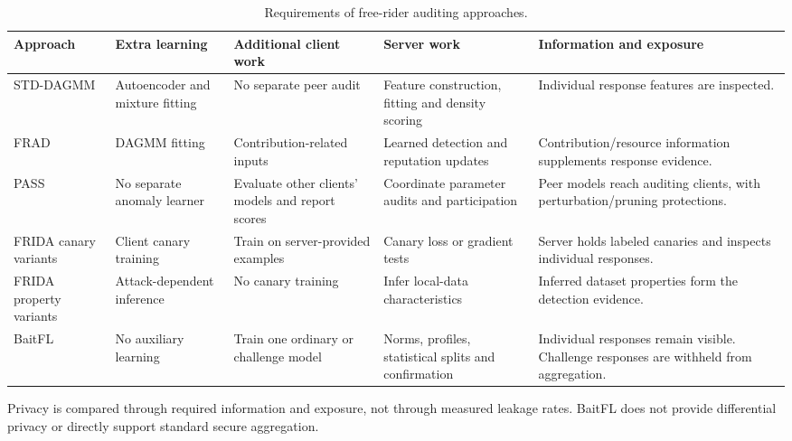 \begin{table}[t]\centering\footnotesize
\renewcommand{\arraystretch}{1.1}
\caption{Requirements of free-rider auditing approaches.}\label{tab:method-comparison}
\begin{tabular}{>{\raggedright\arraybackslash}p{2.0cm}>{\raggedright\arraybackslash}p{2.0cm}>{\raggedright\arraybackslash}p{2.7cm}>{\raggedright\arraybackslash}p{3.6cm}>{\raggedright\arraybackslash}p{5.0cm}}\toprule
Approach & Extra learning & Additional client work & Server work & Information and exposure \\ \midrule
STD-DAGMM~\cite{lin2019freeriders} & Autoencoder and mixture fitting & No separate peer audit & Feature construction, fitting and density scoring & Individual response features are inspected. \\
FRAD~\cite{wang2024frad} & DAGMM fitting & Contribution-related inputs & Learned detection and reputation updates & Contribution/resource information supplements response evidence. \\
PASS~\cite{wang2024pass} & No separate anomaly learner & Evaluate other clients' models and report scores & Coordinate parameter audits and participation & Peer models reach auditing clients, with perturbation/pruning protections. \\
FRIDA canary variants~\cite{recasens2026frida} & Client canary training & Train on server-provided examples & Canary loss or gradient tests & Server holds labeled canaries and inspects individual responses. \\
FRIDA property variants~\cite{recasens2026frida} & Attack-dependent inference & No canary training & Infer local-data characteristics & Inferred dataset properties form the detection evidence. \\
BaitFL & No auxiliary learning & Train one ordinary or challenge model & Norms, profiles, statistical splits and confirmation & Individual responses remain visible. Challenge responses are withheld from aggregation. \\
\bottomrule\end{tabular}
\par\smallskip\parbox{0.97\textwidth}{\scriptsize Privacy is compared through required information and exposure, not through measured leakage rates. BaitFL does not provide differential privacy or directly support standard secure aggregation.}
\end{table}
